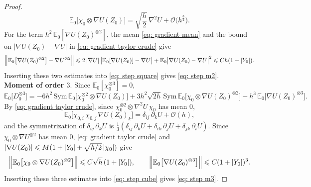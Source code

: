 \begin{proof}
    \begin{equation*}
        \mathbb E_0\bigl[ \chi_0 \otimes \nabla U(Z_0) \bigr] = \sqrt{\frac h2}\, \nabla^2 U + \mathcal O\bigl( h^{\frac32} \bigr) .
    \end{equation*}
    For the term $h^2\, \mathbb E_0[ \nabla U(Z_0)^{\otimes 2} ]$, the mean \eqref{eq: gradient mean} and the bound on $|\nabla U(Z_0) - \nabla U|$ in \eqref{eq: gradient taylor crude} give
    \begin{equation*}
        \Bigl\| \mathbb E_0\bigl[ \nabla U(Z_0)^{\otimes 2} \bigr] - \nabla U^{\otimes 2} \Bigr\| \leqslant 2\, |\nabla U|\, \bigl| \mathbb E_0[\nabla U(Z_0)] - \nabla U \bigr| + \mathbb E_0 \bigl| \nabla U(Z_0) - \nabla U \bigr|^2 \leqslant C h (1+|Y_0|) .
    \end{equation*}
    Inserting these two estimates into \eqref{eq: step square} gives \eqref{eq: step m2}.\\[6pt]
    \textbf{Moment of order $3$}. Since $\mathbb E_0[\chi_0^{\otimes 3}] = 0$,
    \begin{equation}
        \mathbb E_0\bigl[ D_0^{\otimes 3} \bigr] = - 6h^2\, \mathrm{Sym}\, \mathbb E_0\bigl[ \chi_0^{\otimes 2} \otimes \nabla U(Z_0) \bigr] + 3h^2 \sqrt{2h}\, \mathrm{Sym}\, \mathbb E_0\bigl[ \chi_0 \otimes \nabla U(Z_0)^{\otimes 2} \bigr] - h^3\, \mathbb E_0\bigl[ \nabla U(Z_0)^{\otimes 3} \bigr] .
        \label{eq: step cube}
    \end{equation}
    By \eqref{eq: gradient taylor crude}, since $\chi_0^{\otimes 2} \otimes \nabla^2 U\, \chi_0$ has mean $0$,
    \begin{equation*}
        \mathbb E_0\bigl[ \chi_{0,i}\, \chi_{0,j}\, \nabla U(Z_0)_k \bigr] = \delta_{ij}\, \partial_k U + \mathcal O(h) ,
    \end{equation*}
    and the symmetrization of $\delta_{ij}\, \partial_k U$ is $\frac13 ( \delta_{ij}\, \partial_k U + \delta_{ik}\, \partial_j U + \delta_{jk}\, \partial_i U )$. Since $\chi_0 \otimes \nabla U^{\otimes 2}$ has mean $0$, \eqref{eq: gradient taylor crude} and $|\nabla U(Z_0)| \leqslant M ( 1 + |Y_0| + \sqrt{h/2}\, |\chi_0| )$ give
    \begin{equation*}
        \Bigl\| \mathbb E_0\bigl[ \chi_0 \otimes \nabla U(Z_0)^{\otimes 2} \bigr] \Bigr\| \leqslant C \sqrt h\, (1+|Y_0|) , \qquad
        \Bigl\| \mathbb E_0\bigl[ \nabla U(Z_0)^{\otimes 3} \bigr] \Bigr\| \leqslant C (1+|Y_0|)^3 .
    \end{equation*}
    Inserting these three estimates into \eqref{eq: step cube} gives \eqref{eq: step m3}.
\end{proof}

